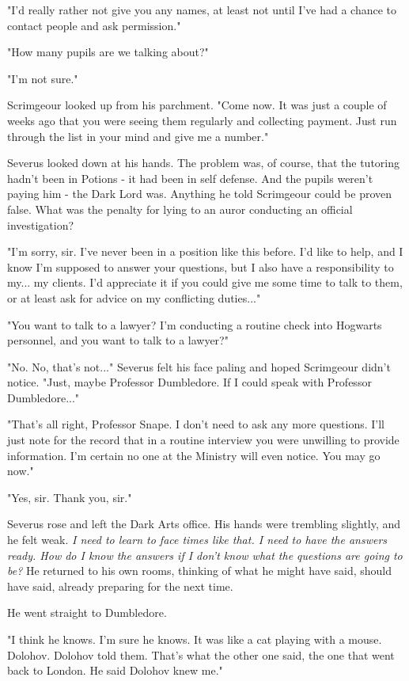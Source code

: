"I'd really rather not give you any names, at least not until I've had a chance to contact people and ask permission."

"How many pupils are we talking about?"

"I'm not sure."

Scrimgeour looked up from his parchment. "Come now. It was just a couple of weeks ago that you were seeing them regularly and collecting payment. Just run through the list in your mind and give me a number."

Severus looked down at his hands. The problem was, of course, that the tutoring hadn't been in Potions - it had been in self defense. And the pupils weren't paying him - the Dark Lord was. Anything he told Scrimgeour could be proven false. What was the penalty for lying to an auror conducting an official investigation?

"I'm sorry, sir. I've never been in a position like this before. I'd like to help, and I know I'm supposed to answer your questions, but I also have a responsibility to my... my clients. I'd appreciate it if you could give me some time to talk to them, or at least ask for advice on my conflicting duties..."

"You want to talk to a lawyer? I'm conducting a routine check into Hogwarts personnel, and you want to talk to a lawyer?"

"No. No, that's not..." Severus felt his face paling and hoped Scrimgeour didn't notice. "Just, maybe Professor Dumbledore. If I could speak with Professor Dumbledore..."

"That's all right, Professor Snape. I don't need to ask any more questions. I'll just note for the record that in a routine interview you were unwilling to provide information. I'm certain no one at the Ministry will even notice. You may go now."

"Yes, sir. Thank you, sir."

Severus rose and left the Dark Arts office. His hands were trembling slightly, and he felt weak. \emph{I need to learn to face times like that. I need to have the answers ready. How do I know the answers if I don't know what the questions are going to be?} He returned to his own rooms, thinking of what he might have said, should have said, already preparing for the next time.

He went straight to Dumbledore.

"I think he knows. I'm sure he knows. It was like a cat playing with a mouse. Dolohov. Dolohov told them. That's what the other one said, the one that went back to London. He said Dolohov knew me."

